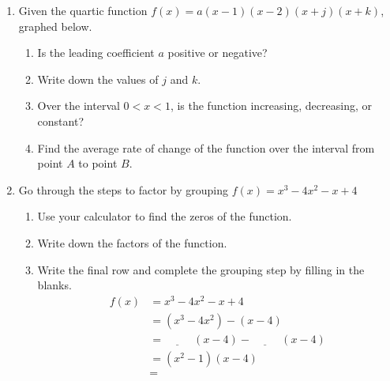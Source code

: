 \documentclass[12pt, twoside]{article}
\begin{document}
\begin{enumerate}
\item Given the quartic function $f(x) = a(x-1)(x-2)(x+j)(x+k)$, graphed below.
\begin{enumerate}[itemsep=1cm]
    \item Is the leading coefficient $a$ positive or negative?
    \item Write down the values of $j$ and $k$.
    \item Over the interval $0 < x < 1$, is the function increasing, decreasing, or constant?
    \item Find the average rate of change of the function over the interval from point $A$ to point $B$. \vspace{2cm}
\end{enumerate}
\begin{center}
    \end{center}

\newpage 
\item Go through the steps to factor by grouping $f(x) = x^3-4x^2-x+4$
\begin{enumerate}[itemsep=1cm]
    \item Use your calculator to find the zeros of the function.
    \item Write down the factors of the function.
    \item Write the final row and complete the grouping step by filling in the blanks.
    \begin{align*}
        f(x) &= x^3-4x^2-x+4 \\[0.5cm]
             &= (x^3-4x^2)-(x-4) \\[0.5cm]
             &= \underline{\hspace{1cm}}\;(x-4) - \underline{\hspace{1cm}}\;(x-4) \\[0.5cm]
             &= (x^2-1)(x-4) \\[0.5cm]
             &=
        \end{align*}
\end{enumerate}


\end{enumerate}
\end{document}
